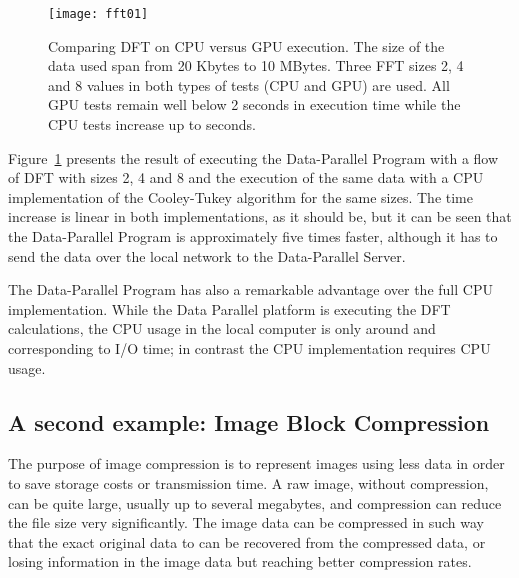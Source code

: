 \documentclass[conference]{IEEEtran}
\newcommand{\is}{250pt} \newcommand{\iss}{250pt}
\begin{document}
\begin{figure}[t]
\begin{center}
\texttt{[image: fft01]}
\end{center}
\caption{Comparing DFT on CPU versus GPU execution. The size of the data used
  span from 20 Kbytes to 10 MBytes. Three FFT sizes 2, 4 and 8 values in both
  types of tests (CPU and GPU) are used. All GPU tests remain well below 2
  seconds in execution time while the CPU tests increase up to 
  seconds.}
\label{fig:fft01}
\end{figure}

Figure~\ref{fig:fft01} presents the result of executing the Data-Parallel
Program with a flow of DFT with sizes 2, 4 and 8 and the execution of the same
data with a CPU implementation of the Cooley-Tukey algorithm for the same
sizes. The time increase is linear in both implementations, as it should be, but
it can be seen that the Data-Parallel Program is approximately five times
faster, although it has to send the data over the local network to the
Data-Parallel Server.

The Data-Parallel Program has also a remarkable advantage over the full CPU
implementation. While the Data Parallel platform is executing the DFT
calculations, the CPU usage in the local computer is only around  and
corresponding to I/O time; in contrast the CPU implementation requires  CPU usage.

\subsection{A second example: Image Block Compression}

\begin{figure*}[!t]
\centerline{
\hfil
{}
\hfil
{}}
\caption{Image compression from (a) original image to (c) compressed result. The
  block compression is done in the (b) luminance of the image, the colour layer
  is scaled down 1/4th from the full picture. Uncompressed size is  Kbytes, and compressed size is  Kbytes}
\label{fig:compress}
\end{figure*}

The purpose of image compression is to represent images using less data in order
to save storage costs or transmission time.  A raw image, without compression,
can be quite large, usually up to several megabytes, and compression can reduce
the file size very significantly. The image data can be compressed in such way
that the exact original data to can be recovered from the compressed data, or
losing information in the image data but reaching better compression rates.
\end{document}
